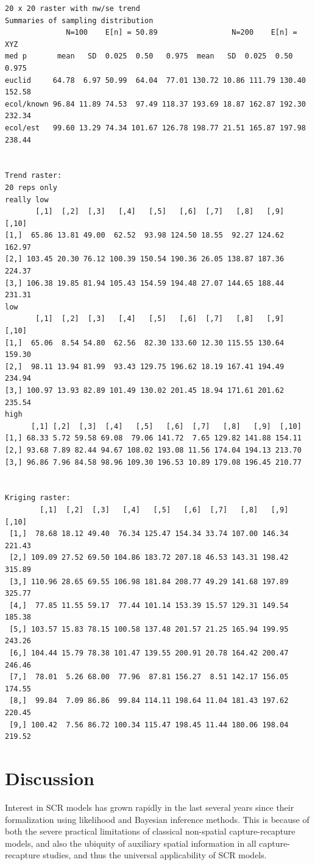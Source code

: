 \documentclass[12pt]{article}
\begin{document}
\begin{verbatim}
20 x 20 raster with nw/se trend
Summaries of sampling distribution
              N=100    E[n] = 50.89                 N=200    E[n] = XYZ
med p       mean   SD  0.025  0.50   0.975  mean   SD  0.025  0.50   0.975
euclid     64.78  6.97 50.99  64.04  77.01 130.72 10.86 111.79 130.40 152.58
ecol/known 96.84 11.89 74.53  97.49 118.37 193.69 18.87 162.87 192.30 232.34
ecol/est   99.60 13.29 74.34 101.67 126.78 198.77 21.51 165.87 197.98 238.44


Trend raster:
20 reps only
really low
       [,1]  [,2]  [,3]   [,4]   [,5]   [,6]  [,7]   [,8]   [,9]  [,10]
[1,]  65.86 13.81 49.00  62.52  93.98 124.50 18.55  92.27 124.62 162.97
[2,] 103.45 20.30 76.12 100.39 150.54 190.36 26.05 138.87 187.36 224.37
[3,] 106.38 19.85 81.94 105.43 154.59 194.48 27.07 144.65 188.44 231.31
low
       [,1]  [,2]  [,3]   [,4]   [,5]   [,6]  [,7]   [,8]   [,9]  [,10]
[1,]  65.06  8.54 54.80  62.56  82.30 133.60 12.30 115.55 130.64 159.30
[2,]  98.11 13.94 81.99  93.43 129.75 196.62 18.19 167.41 194.49 234.94
[3,] 100.97 13.93 82.89 101.49 130.02 201.45 18.94 171.61 201.62 235.54
high
      [,1] [,2]  [,3]  [,4]   [,5]   [,6]  [,7]   [,8]   [,9]  [,10]
[1,] 68.33 5.72 59.58 69.08  79.06 141.72  7.65 129.82 141.88 154.11
[2,] 93.68 7.89 82.44 94.67 108.02 193.08 11.56 174.04 194.13 213.70
[3,] 96.86 7.96 84.58 98.96 109.30 196.53 10.89 179.08 196.45 210.77


Kriging raster:
        [,1]  [,2]  [,3]   [,4]   [,5]   [,6]  [,7]   [,8]   [,9]  [,10]
 [1,]  78.68 18.12 49.40  76.34 125.47 154.34 33.74 107.00 146.34 221.43
 [2,] 109.09 27.52 69.50 104.86 183.72 207.18 46.53 143.31 198.42 315.89
 [3,] 110.96 28.65 69.55 106.98 181.84 208.77 49.29 141.68 197.89 325.77
 [4,]  77.85 11.55 59.17  77.44 101.14 153.39 15.57 129.31 149.54 185.38
 [5,] 103.57 15.83 78.15 100.58 137.48 201.57 21.25 165.94 199.95 243.26
 [6,] 104.44 15.79 78.38 101.47 139.55 200.91 20.78 164.42 200.47 246.46
 [7,]  78.01  5.26 68.00  77.96  87.81 156.27  8.51 142.17 156.05 174.55
 [8,]  99.84  7.09 86.86  99.84 114.11 198.64 11.04 181.43 197.62 220.45
 [9,] 100.42  7.56 86.72 100.34 115.47 198.45 11.44 180.06 198.04 219.52
\end{verbatim}


\section{Discussion}

Interest in SCR models has grown rapidly in the last several years
since their formalization using likelihood \citep{borchers_efford:2008}
and Bayesian \citep{royle_young:2008} inference methods. This is because
of both the severe practical limitations of classical non-spatial
capture-recapture models, and also the ubiquity of auxiliary spatial
information in all capture-recapture studies, and thus the universal
applicability of SCR models.
\end{document}
